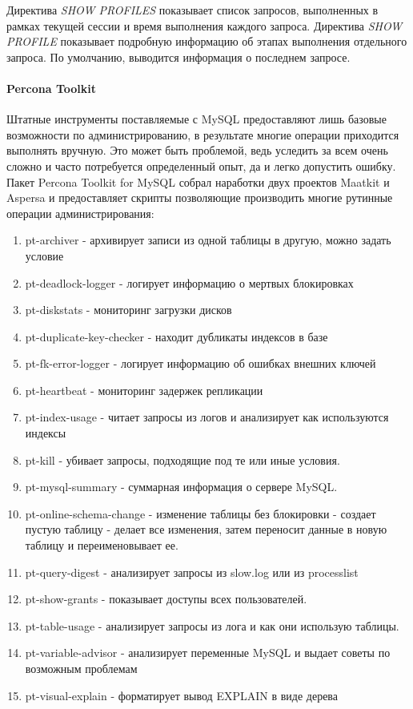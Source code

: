Директива \textit{SHOW PROFILES} показывает список запросов, выполненных в рамках текущей сессии и время выполнения каждого запроса. Директива \textit{SHOW PROFILE} показывает подробную информацию об этапах выполнения
отдельного запроса. По умолчанию, выводится информация о последнем запросе.

\paragraph{Percona Toolkit}

Штатные инструменты поставляемые с MySQL предоставляют лишь базовые возможности по администрированию, в результате многие операции приходится выполнять вручную. Это может быть проблемой, ведь уследить за всем очень сложно и часто потребуется определенный опыт, да и легко допустить ошибку. Пакет Percona Toolkit for MySQL собрал наработки двух проектов Maatkit и Aspersa и предоставляет скрипты позволяющие производить многие рутинные операции администрирования: \cite{xakep.ru:mysql-admin-toolkit}

\begin{enumerate}
\item pt-archiver - архивирует записи из одной таблицы в другую, можно задать условие
\item pt-deadlock-logger - логирует информацию о мертвых блокировках 
\item pt-diskstats - мониторинг загрузки дисков
\item pt-duplicate-key-checker - находит дубликаты индексов в базе
\item pt-fk-error-logger - логирует информацию об ошибках внешних ключей
\item pt-heartbeat - мониторинг задержек репликации
\item pt-index-usage - читает запросы из логов и анализирует как используются индексы
\item pt-kill - убивает запросы, подходящие под те или иные условия.
\item pt-mysql-summary - суммарная информация о сервере MySQL.
\item pt-online-schema-change - изменение таблицы без блокировки - создает пустую таблицу - делает все изменения, затем переносит данные в новую таблицу и переименовывает ее.
\item pt-query-digest - анализирует запросы из slow.log или из processlist
\item pt-show-grants - показывает доступы всех пользователей.
\item pt-table-usage - анализирует запросы из лога и как они использую таблицы.
\item pt-variable-advisor - анализирует переменные MySQL и выдает советы по возможным проблемам
\item pt-visual-explain - форматирует вывод EXPLAIN в виде дерева
\end{enumerate}
\cite{blog.dh.md:Percona_Toolkit}


